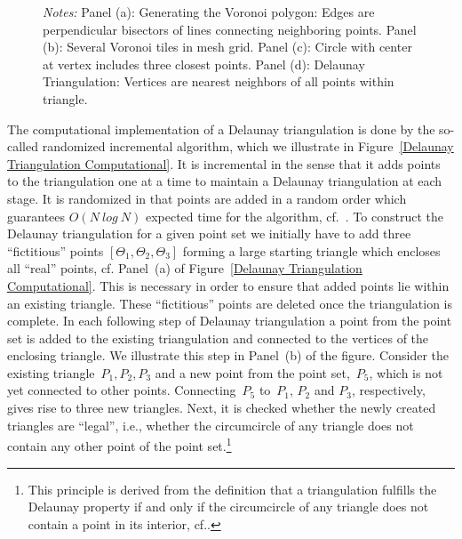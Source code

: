 \documentclass[a4paper,12pt]{article}
\begin{document}
\begin{figure}[htbp]
\begin{tabular}{cC{1cm}c}
	\end{tabular}
	\caption*{\footnotesize{\emph{Notes:} Panel (a): Generating the Voronoi polygon: Edges are perpendicular bisectors of lines connecting neighboring points. Panel (b): Several Voronoi tiles in mesh grid. Panel (c): Circle with center at vertex includes three closest points. Panel (d): Delaunay Triangulation: Vertices are nearest neighbors of all points within triangle.}}
\end{figure}

The computational implementation of a Delaunay triangulation is done by the so-called randomized incremental algorithm, which we illustrate in Figure~\ref{Delaunay Triangulation Computational}. It is incremental in the sense that it adds points to the triangulation one at a time to maintain a Delaunay triangulation at each stage. It is randomized in that points are added in a random order which guarantees $O(N~log~N)$ expected time for the algorithm, cf.~. To construct the Delaunay triangulation for a given point set we initially have to add three ``fictitious'' points $\left[\Theta_{1},\Theta_{2},\Theta_{3}\right]$ forming a large starting triangle which encloses all ``real'' points, cf. Panel~(a) of Figure~\ref{Delaunay Triangulation Computational}. This is necessary in order to ensure that added points lie within an existing triangle. These ``fictitious'' points are deleted once the triangulation is complete. In each following step of Delaunay triangulation a point from the point set is added to the existing triangulation and connected to the vertices of the enclosing triangle. We illustrate this step in Panel~(b) of the figure. Consider the existing triangle~$P_{1},P_{2},P_{3}$ and a new point from the point set,~$P_{5}$, which is not yet connected to other points. Connecting~$P_{5}$ to~$P_{1}$, $P_{2}$ and $P_{3}$, respectively, gives rise to three new triangles. Next, it is checked whether the newly created triangles are ``legal'', i.e., whether the circumcircle of any triangle does not contain any other point of the point set.\footnote{This principle is derived from the definition that a triangulation fulfills the Delaunay property if and only if the circumcircle of any triangle does not contain a point in its interior, cf..}
\end{document}
